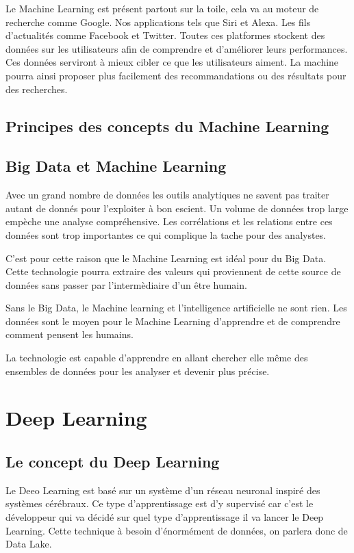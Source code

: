 \documentclass[12pt,a4paper]{report}
\begin{document}
Le Machine Learning est présent partout sur la toile, cela va au moteur de recherche comme Google. Nos applications tels que Siri et Alexa. Les fils d'actualités comme Facebook et Twitter. Toutes ces platformes stockent des données sur les utilisateurs afin de comprendre et d'améliorer leurs performances. Ces données serviront à mieux cibler ce que les utilisateurs aiment. La machine pourra ainsi proposer plus facilement des recommandations ou des résultats pour des recherches.
\pagebreak

\section{Principes des concepts du Machine Learning}


\section{Big Data et Machine Learning}

Avec un grand nombre de données les outils analytiques ne savent pas traiter autant de donnés pour l'exploiter à bon escient. Un volume de données trop large empèche une analyse compréhensive. Les corrélations et les relations entre ces données sont trop importantes ce qui complique la tache pour des analystes. 

C'est pour cette raison que le Machine Learning est idéal pour du Big Data. Cette technologie pourra extraire des valeurs qui proviennent de cette source de données sans passer par l'intermèdiaire d'un être humain.

Sans le Big Data, le Machine learning et l'intelligence artificielle ne sont rien. Les données sont le moyen pour le Machine Learning d'apprendre et de comprendre comment pensent les humains. 

La technologie est capable d'apprendre en allant chercher elle même des ensembles de données pour les analyser et devenir plus précise.

\chapter{Deep Learning}
\section{Le concept du Deep Learning}

Le Deeo Learning est basé sur un système d'un réseau neuronal inspiré des systèmes cérébraux. Ce type d'apprentissage est d'y supervisé car c'est le développeur qui va décidé sur quel type d'apprentissage il va lancer le Deep Learning. Cette technique à besoin d'énormément de données, on parlera donc de Data Lake. 
\end{document}
